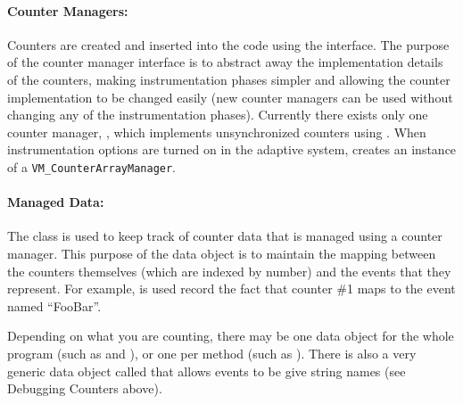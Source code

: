 \paragraph{Counter Managers:}  Counters are created and inserted into
the code using the 
interface.
The purpose of the counter manager interface is to abstract away the
implementation details of the counters, making instrumentation
phases simpler and allowing the counter implementation to be changed
easily (new counter managers can be used without changing any of the
instrumentation phases).  Currently there exists only one counter
manager, 
, which implements unsynchronized
counters using 
.  
When instrumentation options
are turned on in the adaptive system, 
creates an instance of a {\tt VM\_CounterArrayManager}.

\paragraph{Managed Data:} The class 
is used to
keep track of counter data that is managed using a counter
manager. This purpose of the data object is to maintain the mapping
between the counters themselves (which are indexed by number) and the
events that they represent.  For example, 
is used record the fact that counter \#1
maps to the event named ``FooBar''.  


Depending on what you are counting, there may be one data object for
the whole program (such as 
 and
), 
or one per method (such as
).  There is also a
very generic data object called 
that
allows events to be give string names (see Debugging Counters above).

